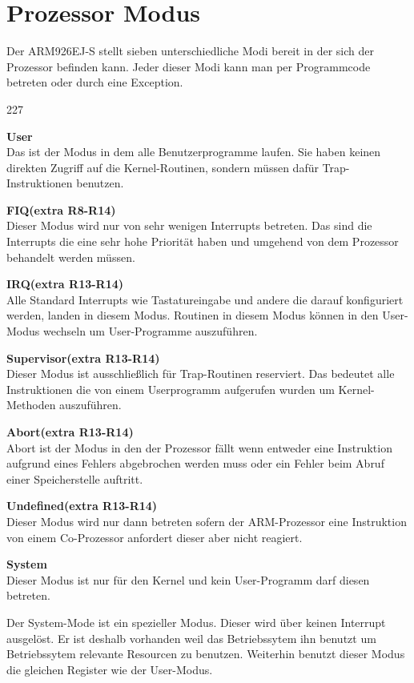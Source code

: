 \section{Prozessor Modus}
Der ARM926EJ-S stellt sieben unterschiedliche Modi bereit in der sich der Prozessor befinden kann. Jeder dieser Modi kann man per Programmcode betreten oder durch eine Exception. 
\begin{dinglist}{227}
	\item{\textbf{User} \\ Das ist der Modus in dem alle Benutzerprogramme laufen. Sie haben keinen direkten Zugriff auf die Kernel-Routinen, sondern m\"ussen daf\"ur Trap-Instruktionen benutzen.}
	\item{\textbf{FIQ(extra R8-R14) }\\ Dieser Modus wird nur von sehr wenigen Interrupts betreten. Das sind die Interrupts die eine sehr hohe Priorit\"at haben und umgehend von dem Prozessor behandelt werden m\"ussen.}
	\item{\textbf{IRQ(extra R13-R14)}\\ Alle Standard Interrupts wie Tastatureingabe und andere die darauf konfiguriert werden, landen in diesem Modus. Routinen in diesem Modus k\"onnen in den User-Modus wechseln um User-Programme auszuf\"uhren.}
	\item{\textbf{Supervisor(extra R13-R14)} \\ Dieser Modus ist ausschlie\ss lich f\"ur Trap-Routinen reserviert. Das bedeutet alle Instruktionen die von einem Userprogramm aufgerufen wurden um Kernel-Methoden auszuf\"uhren.}
	\item{\textbf{Abort(extra R13-R14)}\\ Abort ist der Modus in den der Prozessor f\"allt wenn entweder eine Instruktion aufgrund eines Fehlers abgebrochen werden muss oder ein Fehler beim Abruf einer Speicherstelle auftritt.}
	\item{\textbf{Undefined(extra R13-R14)}\\ Dieser Modus wird nur dann betreten sofern der ARM-Prozessor eine Instruktion von einem Co-Prozessor anfordert dieser aber nicht reagiert.}
	\item{\textbf{System} \\ Dieser Modus ist nur f\"ur den Kernel und kein User-Programm darf diesen betreten.}
\end{dinglist}
Der System-Mode ist ein spezieller Modus. Dieser wird \"uber keinen Interrupt ausgel\"ost. Er ist deshalb vorhanden weil das Betriebssytem ihn benutzt um Betriebssytem relevante Resourcen zu benutzen. Weiterhin benutzt dieser Modus die gleichen Register wie der User-Modus.
